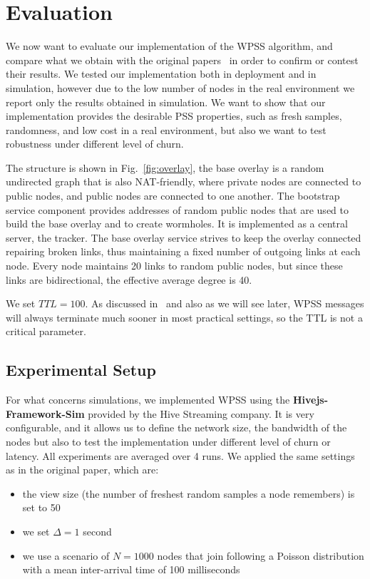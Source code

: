 
\chapter{Evaluation}
\label{cha:evaluation}
We now want to evaluate our implementation of the \ac{WPSS} algorithm, and compare what we obtain with the original papers~\cite{wormhole} in order to confirm or contest their results. We tested our implementation both in deployment and in simulation, however due to the low number of nodes in the real environment we report only the results obtained in simulation. We want to show that our implementation provides the desirable PSS properties, such as fresh samples, randomness, and low cost in a real environment, but also we want to test robustness under different level of churn.

The structure is shown in Fig.~\ref{fig:overlay}, the base overlay is a random undirected graph that is also NAT-friendly, where private nodes are connected to public nodes, and public nodes are connected to one another. The bootstrap service component provides addresses of random public nodes that are used to build the base overlay and to create wormholes. It is implemented as a central server, the tracker. The base overlay service strives to keep the overlay connected repairing broken links, thus maintaining a fixed number of outgoing links at each node. Every node maintains 20 links to random public nodes, but since these links are bidirectional, the effective average degree is 40. 

We set $TTL = 100$. As discussed in~\cite{wormhole} and also as we will see later, \ac{WPSS} messages will always terminate much sooner in most practical settings, so the TTL is not a critical parameter.

\section{Experimental Setup}
\label{sec:exp_setup}
For what concerns simulations, we implemented \ac{WPSS} using the \textbf{Hivejs-Framework-Sim} provided by the Hive Streaming company. It is very configurable, and it allows us to define the network size, the bandwidth of the nodes but also to test the implementation under different level of churn or latency. All experiments are averaged over 4 runs. We applied the same settings as in the original paper, which are: 

\begin{itemize}
	\item the view size (the number of freshest random samples a node remembers) is set to 50
	\item we set $\Delta = 1$ second
	\item we use a scenario of $N = 1000$ nodes that join following a Poisson distribution with a mean inter-arrival time of 100 milliseconds
\end{itemize}

